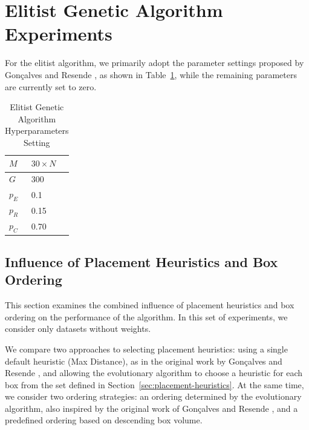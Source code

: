 \section{Elitist Genetic Algorithm Experiments}

For the elitist algorithm, we primarily adopt the parameter settings proposed by Gonçalves and Resende \cite{goncalves2013}, 
as shown in Table~\ref{tab:ega-set-hyperparameters}, while the remaining parameters are currently set to zero.

\begin{table}[htbp]
\centering
\caption{Elitist Genetic Algorithm Hyperparameters Setting}
\label{tab:ega-set-hyperparameters}
\begin{tabular}{|l|l|}
\hline
$M$ & $30 \times N$ \\ \hline
$G$ & 300 \\ \hline
$p_E$ & 0.1 \\ \hline
$p_R$ & 0.15 \\ \hline
$p_C$ & 0.70 \\ \hline
\end{tabular}
\end{table}

\subsection{Influence of Placement Heuristics and Box Ordering}

This section examines the combined influence of placement heuristics 
and box ordering on the performance of the algorithm. 
In this set of experiments, we consider only datasets without weights.

We compare two approaches to selecting placement heuristics: 
using a single default heuristic (Max Distance), as in the original work by Gonçalves and Resende \cite{goncalves2013}, 
and allowing the evolutionary algorithm to choose a heuristic for each box from the set defined in 
Section~\ref{sec:placement-heuristics}. 
At the same time, we consider two ordering strategies: 
an ordering determined by the evolutionary algorithm, also inspired by the original work of Gonçalves and Resende \cite{goncalves2013}, 
and a predefined ordering based on descending box volume.

